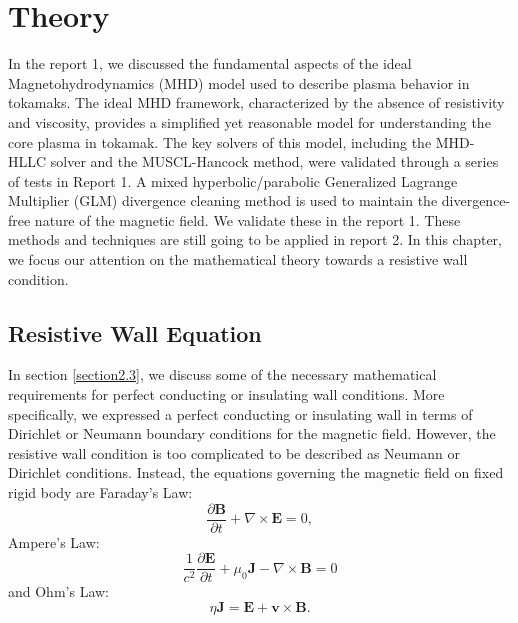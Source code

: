 
\chapter{Theory} 

\ifpdf
\graphicspath{{Chapter7/Figs/Raster/}{Chapter7/Figs/PDF/}{Chapter7/Figs/}}
\else
\graphicspath{{Chapter7/Figs/Vector/}{Chapter7/Figs/}}
\fi

\label{chapter 7}


In the report 1, we discussed the fundamental aspects of the ideal Magnetohydrodynamics (MHD) model used to describe plasma behavior in tokamaks. The ideal MHD framework, characterized by the absence of resistivity and viscosity, provides a simplified yet reasonable model for understanding the core plasma in tokamak. The key solvers of this model, including the MHD-HLLC solver and the MUSCL-Hancock method, were validated through a series of tests in Report 1. A mixed hyperbolic/parabolic Generalized Lagrange Multiplier (GLM) divergence cleaning method is used to maintain the divergence-free nature of the magnetic field. We validate these in the report 1. These methods and techniques are still going to be applied in report 2. In this chapter, we focus our attention on the mathematical theory towards a resistive wall condition.

\section{Resistive Wall Equation}
\label{section7.1}
In section \ref{section2.3}, we discuss some of the necessary mathematical requirements for perfect conducting or insulating wall conditions. More specifically, we expressed a perfect conducting or insulating wall in terms of Dirichlet or Neumann boundary conditions for the magnetic field. However, the resistive wall condition is too complicated to be described as Neumann or Dirichlet conditions. Instead, the equations governing the magnetic field on fixed rigid body are Faraday's Law:
$$
\frac{\partial \mathbf{B}}{\partial t} + \nabla \times \mathbf{E} = 0 ,
$$ 
Ampere's Law:
$$
\frac{1}{c^2}\frac{\partial \mathbf{E}}{\partial t} + \mu_0 \mathbf{J} - \nabla \times \mathbf{B} = 0  
$$
and Ohm's Law:
$$
\eta \mathbf{J} = \mathbf{E} + \mathbf{v} \times \mathbf{B} .
$$

